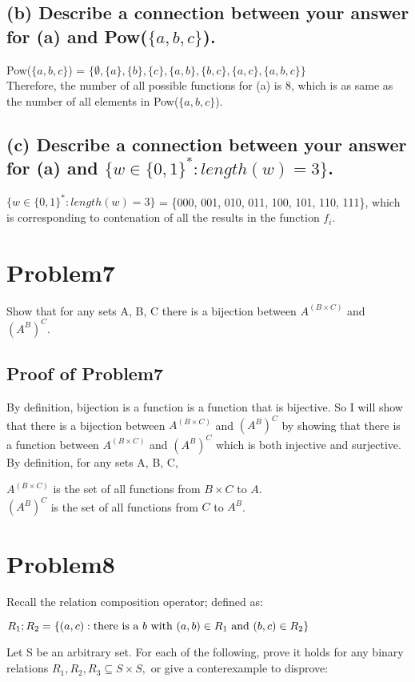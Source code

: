 \documentclass[]{article}
\begin{document}
\begin{spacing}{1.5}
\subsection*{(b) Describe a connection between your answer for (a) and Pow($ \{a, b, c\} $).}

Pow($ \{a, b, c\} $) = $ \{\emptyset, \{a\}, \{b\}, \{c\}, \{a, b\}, \{b, c\}, \{a, c\}, \{a, b, c\}  \} $\\
Therefore, the number of all possible functions for (a) is 8, which is  as same as the number of all elements in Pow($ \{a, b, c\} $).

\subsection*{(c) Describe a connection between your answer for (a) and $ \{w \in \{0,1\} ^ {*} : length(w) = 3\} $.}

$ \{w \in \{0,1\} ^ {*} : length(w) = 3\} $ = \{000, 001, 010, 011, 100, 101, 110, 111\}, which is corresponding to contenation of all the results in the function $ f_i $.

\section*{Problem7}
Show that for any sets A, B, C there is a bijection between $ A^{(B \times C)} $ and $ (A^{B})^{C} $. 
\subsection*{Proof of Problem7}
By definition, bijection is a function is a function that is bijective. So I will show that there is a bijection between $ A^{(B \times C)} $ and $ (A^{B})^{C} $ by showing that there is a function between $ A^{(B \times C)} $ and $ (A^{B})^{C} $ which is both injective and surjective.\\
By definition, for any sets A, B, C,
\begin{center}
	$ A^{(B \times C)} $ is the set of all functions from $ B \times C $ to $ A $.\\
	$ (A^{B})^{C} $ is the set of all functions from $ C $ to $ A^{B} $.
\end{center}

\section*{Problem8}
Recall the relation composition operator; defined as:
\begin{center}
	$ R_1; R_2 = \{(a, c) : \text{there is a $ b $ with } (a, b) \in R_1 \text{ and } (b, c) \in R_2\} $
\end{center}
Let S be an arbitrary set. For each of the following, prove it holds for any binary relations $ R_1, R_2, R_3  \subseteq S \times S,$ or give a conterexample to disprove:


\end{spacing}
\end{document}
